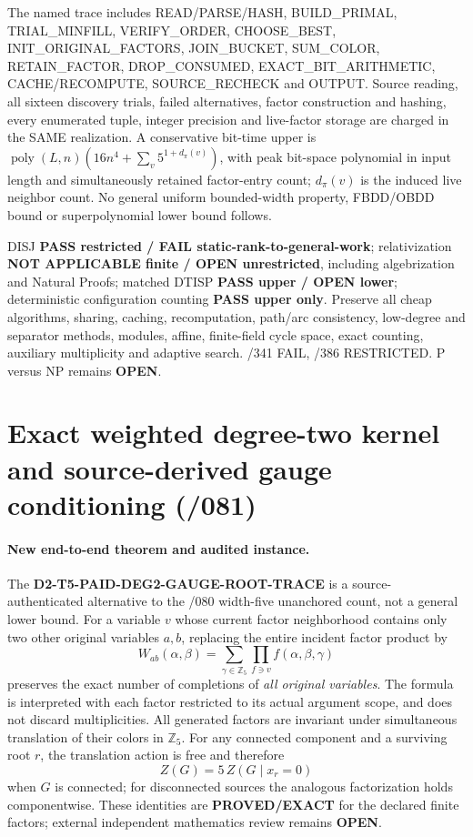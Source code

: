 \documentclass[11pt]{article}
\begin{document}
The named trace includes READ/PARSE/HASH, BUILD\_PRIMAL,
TRIAL\_MINFILL, VERIFY\_ORDER, CHOOSE\_BEST,
INIT\_ORIGINAL\_FACTORS, JOIN\_BUCKET, SUM\_COLOR,
RETAIN\_FACTOR, DROP\_CONSUMED, EXACT\_BIT\_ARITHMETIC,
CACHE/RECOMPUTE, SOURCE\_RECHECK and OUTPUT.
Source reading, all sixteen discovery trials, failed alternatives,
factor construction and hashing, every enumerated tuple, integer
precision and live-factor storage are charged in the SAME realization.
A conservative bit-time upper is
$\operatorname{poly}(L,n)
(16n^4+\sum_v5^{1+d_{\pi}(v)})$,
with peak bit-space polynomial in input length and simultaneously
retained factor-entry count; $d_{\pi}(v)$ is the induced live
neighbor count.  No general uniform bounded-width property,
FBDD/OBDD bound or superpolynomial lower bound follows.

DISJ \textbf{PASS restricted / FAIL static-rank-to-general-work};
relativization \textbf{NOT APPLICABLE finite / OPEN unrestricted},
including algebrization and Natural Proofs; matched DTISP
\textbf{PASS upper / OPEN lower}; deterministic configuration counting
\textbf{PASS upper only}.  Preserve all cheap algorithms, sharing,
caching, recomputation, path/arc consistency, low-degree and separator
methods, modules, affine, finite-field cycle space, exact counting,
auxiliary multiplicity and adaptive search. /341 FAIL, /386 RESTRICTED.
P versus NP remains \textbf{OPEN}.

\section{Exact weighted degree-two kernel and source-derived gauge conditioning (/081)}
\paragraph{New end-to-end theorem and audited instance.}
The \textbf{D2-T5-PAID-DEG2-GAUGE-ROOT-TRACE} is a
source-authenticated alternative to the /080 width-five
unanchored count, not a general lower bound.  For a variable $v$
whose current factor neighborhood contains only two other original
variables $a,b$, replacing the entire incident factor product by
\[
W_{ab}(\alpha,\beta)=
\sum_{\gamma\in\mathbb Z_5}
\prod_{f\ni v}f(\alpha,\beta,\gamma)
\]
preserves the exact number of completions of \emph{all original
variables}. The formula is interpreted with each factor restricted
to its actual argument scope, and does not discard multiplicities.
All generated factors are invariant under simultaneous
translation of their colors in $\mathbb Z_5$.
For any connected component and a surviving root $r$, the
translation action is free and therefore
\[
Z(G)=5\,Z(G\mid x_r=0)
\]
when $G$ is connected; for disconnected sources the analogous
factorization holds componentwise. These identities are
\textbf{PROVED/EXACT} for the declared finite factors; external
independent mathematics review remains \textbf{OPEN}.
\end{document}
